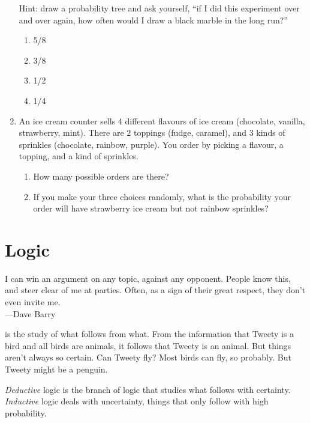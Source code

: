 \documentclass[justified]{tufte-book}
\providecommand{\tightlist}{%
  \setlength{\itemsep}{0pt}\setlength{\parskip}{0pt}}
\newenvironment{epigraph}%
{
\begin{flushright}    
\begin{minipage}{20em}
\begin{flushright}
\itshape
}%
{
\end{flushright}
\end{minipage}
\end{flushright}
}
\theoremstyle{definition}
\theoremstyle{definition}
\theoremstyle{definition}
\theoremstyle{definition}
\theoremstyle{remark}
\begin{document}
\begin{enumerate}
  Hint: draw a probability tree and ask yourself, ``if I did this experiment over and over again, how often would I draw a black marble in the long run?''

  \begin{enumerate}
  \def\labelenumii{\alph{enumii}.}
  \tightlist
  \item
    5/8
  \item
    3/8
  \item
    1/2
  \item
    1/4
  \end{enumerate}
\item
  An ice cream counter sells 4 different flavours of ice cream (chocolate, vanilla, strawberry, mint). There are \(2\) toppings (fudge, caramel), and \(3\) kinds of sprinkles (chocolate, rainbow, purple). You order by picking a flavour, a topping, and a kind of sprinkles.

  \begin{enumerate}
  \def\labelenumii{\alph{enumii}.}
  \tightlist
  \item
    How many possible orders are there?
  \item
    If you make your three choices randomly, what is the probability your order will have strawberry ice cream but not rainbow sprinkles?
  \end{enumerate}
\end{enumerate}

\hypertarget{logic}{%
\chapter{Logic}\label{logic}}

\begin{epigraph}
I can win an argument on any topic, against any opponent. People know
this, and steer clear of me at parties. Often, as a sign of their great
respect, they don't even invite me.\\
---Dave Barry
\end{epigraph}

 is the study of what follows from what. From the information that Tweety is a bird and all birds are animals, it follows that Tweety is an animal. But things aren't always so certain. Can Tweety fly? Most birds can fly, so probably. But Tweety might be a penguin.

\emph{Deductive} logic is the branch of logic that studies what follows with certainty. \emph{Inductive} logic deals with uncertainty, things that only follow with high probability.
\end{document}
